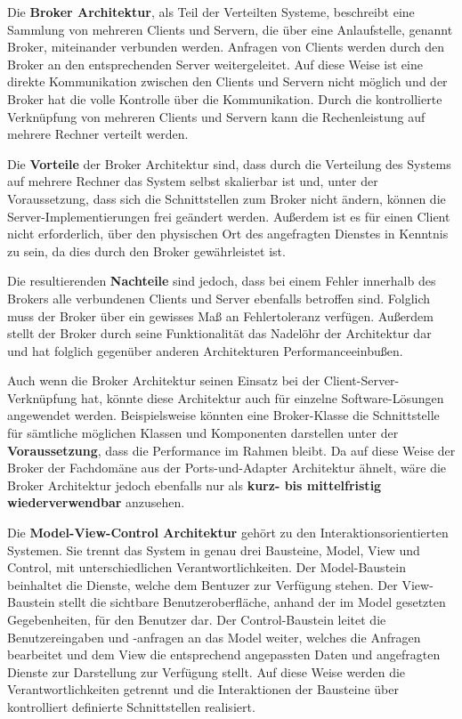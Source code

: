 \documentclass[utf8,biblatex]{lni}
\begin{document}

Die \textbf{Broker Architektur}, als Teil der Verteilten Systeme, beschreibt eine Sammlung von mehreren Clients und Servern, die über eine Anlaufstelle, genannt Broker, miteinander verbunden werden. Anfragen von Clients werden durch den Broker an den entsprechenden Server weitergeleitet. Auf diese Weise ist eine direkte Kommunikation zwischen den Clients und Servern nicht möglich und der Broker hat die volle Kontrolle über die Kommunikation. Durch die kontrollierte Verknüpfung von mehreren Clients und Servern kann die Rechenleistung auf mehrere Rechner verteilt werden.

Die \textbf{Vorteile} der Broker Architektur sind, dass durch die Verteilung des Systems auf mehrere Rechner das System selbst skalierbar ist und, unter der Voraussetzung, dass sich die Schnittstellen zum Broker nicht ändern, können die Server-Implementierungen frei geändert werden. Außerdem ist es für einen Client nicht erforderlich, über den physischen Ort des angefragten Dienstes in Kenntnis zu sein, da dies durch den Broker gewährleistet ist.

Die resultierenden \textbf{Nachteile} sind jedoch, dass bei einem Fehler innerhalb des Brokers alle verbundenen Clients und Server ebenfalls betroffen sind. Folglich muss der Broker über ein gewisses Maß an Fehlertoleranz verfügen. Außerdem stellt der Broker durch seine Funktionalität das Nadelöhr der Architektur dar und hat folglich gegenüber anderen Architekturen Performanceeinbußen.

Auch wenn die Broker Architektur seinen Einsatz bei der Client-Server-Verknüpfung hat, könnte diese Architektur auch für einzelne Software-Lösungen angewendet werden. Beispielsweise könnten eine Broker-Klasse die Schnittstelle für sämtliche möglichen Klassen und Komponenten darstellen unter der \textbf{Voraussetzung}, dass die Performance im Rahmen bleibt. Da auf diese Weise der Broker der Fachdomäne aus der Ports-und-Adapter Architektur ähnelt, wäre die Broker Architektur jedoch ebenfalls nur als \textbf{kurz- bis mittelfristig wiederverwendbar} anzusehen.


Die \textbf{Model-View-Control Architektur} gehört zu den Interaktionsorientierten Systemen. Sie trennt das System in genau drei Bausteine, Model, View und Control, mit unterschiedlichen Verantwortlichkeiten. Der Model-Baustein beinhaltet die Dienste, welche dem Bentuzer zur Verfügung stehen. Der View-Baustein stellt die sichtbare Benutzeroberfläche, anhand der im Model gesetzten Gegebenheiten, für den Benutzer dar. Der Control-Baustein leitet die Benutzereingaben und -anfragen an das Model weiter, welches die Anfragen bearbeitet und dem View die entsprechend angepassten Daten und angefragten Dienste zur Darstellung zur Verfügung stellt. Auf diese Weise werden die Verantwortlichkeiten getrennt und die Interaktionen der Bausteine über kontrolliert definierte Schnittstellen realisiert.
\end{document}
